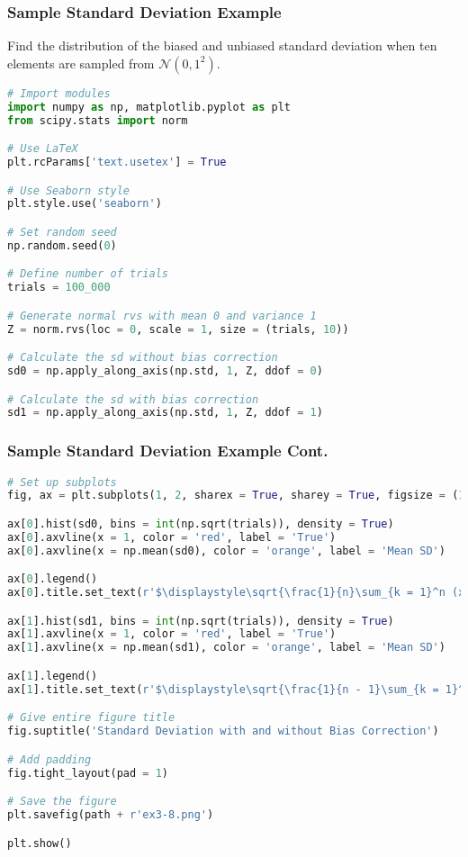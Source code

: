 \documentclass{beamer}
\begin{document}
\begin{frame}[fragile]
\frametitle{Sample Standard Deviation Example}
\small 
\begin{Example}
Find the distribution of the biased and unbiased standard deviation when ten elements are sampled from $\mathcal{N}(0, 1^2)$.
\end{Example}

\begin{lstlisting}[language=Python]
# Import modules
import numpy as np, matplotlib.pyplot as plt
from scipy.stats import norm

# Use LaTeX
plt.rcParams['text.usetex'] = True

# Use Seaborn style
plt.style.use('seaborn')

# Set random seed
np.random.seed(0)

# Define number of trials
trials = 100_000

# Generate normal rvs with mean 0 and variance 1
Z = norm.rvs(loc = 0, scale = 1, size = (trials, 10))

# Calculate the sd without bias correction
sd0 = np.apply_along_axis(np.std, 1, Z, ddof = 0)

# Calculate the sd with bias correction
sd1 = np.apply_along_axis(np.std, 1, Z, ddof = 1)
\end{lstlisting}


\end{frame}

\begin{frame}[fragile]
\frametitle{Sample Standard Deviation Example Cont.}

\begin{lstlisting}[language=Python]
# Set up subplots
fig, ax = plt.subplots(1, 2, sharex = True, sharey = True, figsize = (15, 5), dpi = 125)

ax[0].hist(sd0, bins = int(np.sqrt(trials)), density = True)
ax[0].axvline(x = 1, color = 'red', label = 'True')
ax[0].axvline(x = np.mean(sd0), color = 'orange', label = 'Mean SD')

ax[0].legend()
ax[0].title.set_text(r'$\displaystyle\sqrt{\frac{1}{n}\sum_{k = 1}^n (x_k - \bar{x})^2}$')

ax[1].hist(sd1, bins = int(np.sqrt(trials)), density = True)
ax[1].axvline(x = 1, color = 'red', label = 'True')
ax[1].axvline(x = np.mean(sd1), color = 'orange', label = 'Mean SD')

ax[1].legend()
ax[1].title.set_text(r'$\displaystyle\sqrt{\frac{1}{n - 1}\sum_{k = 1}^n (x_k - \bar{x})^2}$')

# Give entire figure title
fig.suptitle('Standard Deviation with and without Bias Correction')

# Add padding
fig.tight_layout(pad = 1)

# Save the figure
plt.savefig(path + r'ex3-8.png')

plt.show()
\end{lstlisting}

\end{frame}
\end{document}
